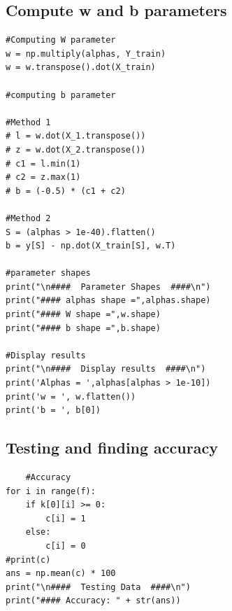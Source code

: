 \documentclass[12pt]{article}
\begin{document}
\subsection{Compute w and b parameters}
\begin{verbatim}
#Computing W parameter
w = np.multiply(alphas, Y_train)
w = w.transpose().dot(X_train)

#computing b parameter

#Method 1
# l = w.dot(X_1.transpose())
# z = w.dot(X_2.transpose())
# c1 = l.min(1)
# c2 = z.max(1)
# b = (-0.5) * (c1 + c2)

#Method 2
S = (alphas > 1e-40).flatten()
b = y[S] - np.dot(X_train[S], w.T)

#parameter shapes
print("\n####  Parameter Shapes  ####\n")
print("#### alphas shape =",alphas.shape)
print("#### W shape =",w.shape)
print("#### b shape =",b.shape)

#Display results
print("\n####  Display results  ####\n")
print('Alphas = ',alphas[alphas > 1e-10])
print('w = ', w.flatten())
print('b = ', b[0])
\end{verbatim}
\subsection{Testing and finding accuracy}
\begin{verbatim}
    #Accuracy
for i in range(f):
    if k[0][i] >= 0:
        c[i] = 1
    else:
        c[i] = 0
#print(c)
ans = np.mean(c) * 100
print("\n####  Testing Data  ####\n")
print("#### Accuracy: " + str(ans))
\end{verbatim}
\end{document}
